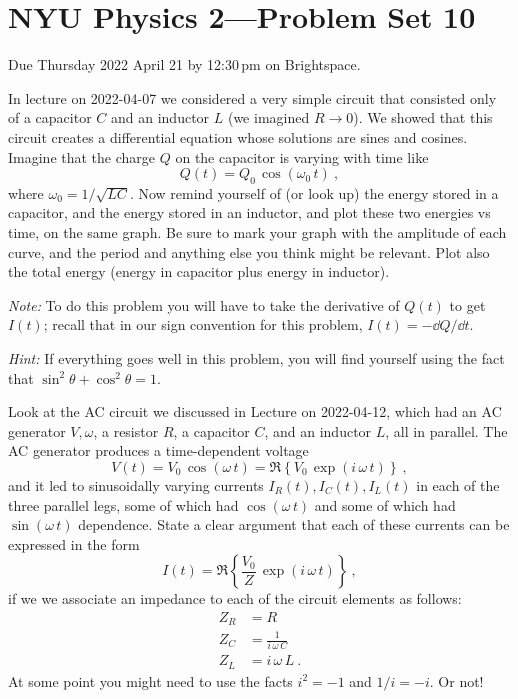 \documentclass[12pt]{article}
\begin{document}
\section*{NYU Physics 2---Problem Set 10}

Due Thursday 2022 April 21 by 12:30\,pm on Brightspace.

\startproblem%
In lecture on 2022-04-07 we considered a very simple circuit that consisted only
of a capacitor $C$ and an inductor $L$ (we imagined $R\rightarrow 0$).
We showed that this circuit creates a differential equation whose solutions
are sines and cosines.
Imagine that the charge $Q$ on the capacitor is varying with time like
\begin{equation}
  Q(t) = Q_0\,\cos(\omega_0\,t) ~,
\end{equation}
where $\omega_0 = 1/\sqrt{LC}$.
Now remind yourself of (or look up) the energy stored in a capacitor, and the energy
stored in an inductor, and plot these two energies vs time, on the same graph.
Be sure to mark your graph with the amplitude of each curve, and the period and anything
else you think might be relevant.
Plot also the total energy (energy in capacitor plus energy in inductor).

\textsl{Note:} To do this problem you will have to take the derivative of $Q(t)$ to get
$I(t)$; recall that in our sign convention for this problem, $I(t)=-\dd Q/\dd t$.

\textsl{Hint:} If everything goes well in this problem, you will find yourself using the fact that $\sin^2\theta + \cos^2\theta = 1$.

\startproblem%
Look at the AC circuit we discussed in Lecture on
2022-04-12, which had an AC generator $V,\omega$, a resistor $R$,
a capacitor $C$, and an inductor $L$, all in parallel.
The AC generator produces a time-dependent voltage
\begin{equation}
  V(t) = V_0\,\cos(\omega\,t) = \Re\left\{V_0\,\exp(i\,\omega\,t)\right\} ~,
\end{equation}
and it led to sinusoidally varying currents $I_R(t), I_C(t), I_L(t)$ in each of the three
parallel legs, some of which had $\cos(\omega\,t)$ and some of which had
$\sin(\omega\,t)$ dependence.
State a clear argument that each of these currents can be expressed in the
form
\begin{equation}
  I(t) = \Re\left\{\frac{V_0}{Z}\,\exp(i\,\omega\,t)\right\} ~,
\end{equation}
if we we associate an impedance to each of the circuit elements as follows:
\begin{align}
  Z_R &= R \\
  Z_C &= \frac{1}{i\,\omega\,C} \\
  Z_L &= i\,\omega\,L ~.
\end{align}
At some point you might need to use the facts $i^2 = -1$ and $1/i = -i$. Or not!
\end{document}

